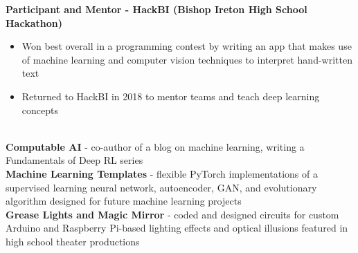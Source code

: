 \documentclass{article}
\begin{document}
\begin{center}
\begin{flushleft}
    \textbf{Participant and Mentor - HackBI  (Bishop Ireton High School Hackathon)}
    \begin{itemize}
      \itemsep0em
      \item Won best overall in a programming contest by writing an app that makes use of machine learning and computer vision techniques to interpret hand-written text
      \item Returned to HackBI in 2018 to mentor teams and teach deep learning concepts
    \end{itemize}


    {\large\textbf{\underline{}}} \\
    \textbf{Computable AI} - co-author of a blog on machine learning, writing a Fundamentals of Deep RL series \\
    \textbf{Machine Learning Templates} - flexible PyTorch implementations of a supervised learning neural network, autoencoder, GAN, and evolutionary algorithm designed for future machine learning projects \\
    \textbf{Grease Lights and Magic Mirror} - coded and designed circuits for custom Arduino and Raspberry Pi-based lighting effects and optical illusions featured in high school theater productions


  \end{flushleft}
  \end{center}
\end{document}
